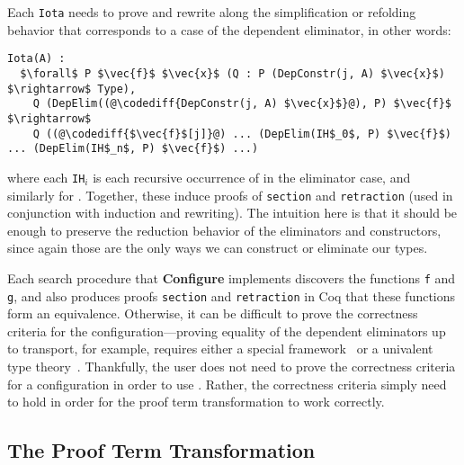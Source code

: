 Each \lstinline{Iota} needs to prove and rewrite along the simplification or refolding behavior that corresponds to a case of the dependent eliminator, in other words: %

\begin{lstlisting}
Iota(A) :
  $\forall$ P $\vec{f}$ $\vec{x}$ (Q : P (DepConstr(j, A) $\vec{x}$) $\rightarrow$ Type),
    Q (DepElim((@\codediff{DepConstr(j, A) $\vec{x}$}@), P) $\vec{f}$ $\rightarrow$ 
    Q ((@\codediff{$\vec{f}$[j]}@) ... (DepElim(IH$_0$, P) $\vec{f}$) ... (DepElim(IH$_n$, P) $\vec{f}$) ...)
\end{lstlisting}
where each \lstinline{IH}$_i$ is each recursive occurrence of \A in the eliminator case,
and similarly for \B.
Together, these induce proofs of \lstinline{section} and \lstinline{retraction} (used in conjunction with
induction and rewriting).
The intuition here is that it should be enough to preserve the reduction behavior
of the eliminators and constructors, since again those are the only ways we can construct or eliminate our types.

Each search procedure that \textbf{Configure} implements discovers the functions \lstinline{f} and \lstinline{g}, and also
produces proofs \lstinline{section} and \lstinline{retraction} in Coq that these functions form an equivalence.
Otherwise, it can be difficult to prove the correctness criteria for the configuration---proving equality of the dependent eliminators
up to transport, for example, requires either a special framework~\cite{tabareau2017equivalences}
or a univalent type theory~\cite{univalent2013homotopy}.
Thankfully, the user does not need to prove the correctness criteria for a configuration in order to use \toolname.
Rather, the correctness criteria simply need to hold in order for the proof term transformation to work correctly.

\subsection{The Proof Term Transformation}
\label{sec:generic}

